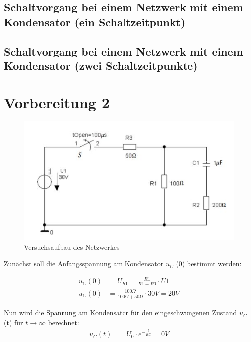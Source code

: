 \documentclass{article}
\begin{document}
\subsection{Schaltvorgang bei einem Netzwerk mit einem Kondensator (ein Schaltzeitpunkt)}

\subsection{Schaltvorgang bei einem Netzwerk mit einem Kondensator (zwei Schaltzeitpunkte)}

\section{Vorbereitung 2}
\begin{figure}[h]
  \begin{center}
    \includegraphics[scale=1]{../assets/images/ET2P5/vorbereitung 2.jpg}
    \caption{Versuchsaufbau des Netzwerkes}
  \end{center}
\end{figure}

Zunächst soll die Anfangsspannung am Kondensator $u_C$ (0) bestimmt werden:

\begin{align*}
  u_C(0) &= U_{R1} = \frac{R1}{R1+R3} \cdot U1 \\
  u_C(0) &= \frac{100\Omega}{100\Omega + 50\Omega} \cdot 30V = 20V
\end{align*}

Nun wird die Spannung am Kondensator für den eingeschwungenen Zustand $u_C$ (t) für $t \rightarrow \infty$ berechnet:
\begin{align*}
  u_C(t)&= U_0 \cdot e^{-\frac{t}{RC}} = 0V
\end{align*}
\end{document}
